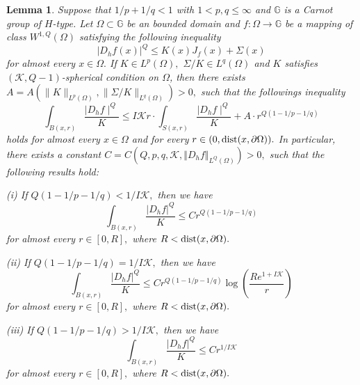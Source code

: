 \documentclass[11pt,twoside]{article}
\newtheorem{lem}[thm]{Lemma}
\theoremstyle{definition}
\theoremstyle{remark}
\newcommand{\abs}[1]{\left|#1\right|}
\begin{document}
\begin{lem}\label{lem0}
 Suppose that  $1/p+1/q<1$ with $1<p,q\leq\infty$ and  $\mathbb{G}$ is a Carnot group of $H$-type. Let $\Omega\subset \mathbb{G}$ be an bounded domain and $f:\Omega\rightarrow \mathbb{G}$ be a mapping of class $W^{1,Q}(\Omega)$ satisfying  the following inequality
$$\vert D_{h}f(x)\vert^{Q}\leq K(x)J_{f}(x)+\Sigma(x)$$
for almost every $x\in\Omega.$ If $K\in L^{p}(\Omega),$ $\Sigma/K\in L^{q}(\Omega)$ and $K$ satisfies $(\mathcal{K}, Q-1)$-spherical condition on $\Omega$,
 then there exists $A=A(\|K\|_{L^{p}(\Omega)},\|\Sigma/K\|_{L^{q}(\Omega)})>0,$ such that the followings inequality
$$\int_{B(x,r)}\frac{\mid D_{h}f\mid^{Q}}{K}\leq I\mathcal{K}r\cdot\int_{S(x,r)}\frac{\mid D_{h}f\mid^{Q}}{K}+A\cdot r^{Q(1-1/p-1/q)}$$
holds for almost every $x\in\Omega$ and for every $r\in(0,{\rm dist}(x,\partial\Omega)).$ In particular, there exists a constant $C=C(Q,  p, q,\mathcal{K},\Vert D_{h}f\Vert_{L^{Q}(\Omega)})>0,$ such that the following results hold:

(i) If $Q(1-1/p-1/q)<1/I\mathcal{K},$ then we have 
$$\int_{B(x,r)}\frac{\abs{ D_{h}f}^{Q}}{K}\leq Cr^{Q(1-1/p-1/q)}$$
for almost every $r\in[0,R],$ where $R<{\rm dist}(x,\partial\Omega).$

(ii) If $Q(1-1/p-1/q)=1/I\mathcal{K},$ then we have 
$$\int_{B(x,r)}\frac{\abs{ D_{h}f}^{Q}}{K}\leq Cr^{Q(1-1/p-1/q)}\log\left(\frac{Re^{1+I\mathcal{K}}}{r}\right)$$
for almost every $r\in[0,R],$ where $R<{\rm dist}(x,\partial\Omega).$

(iii) If $Q(1-1/p-1/q)>1/I\mathcal{K},$ then we have 
$$\int_{B(x,r)}\frac{\abs{ D_{h}f}^{Q}}{K}\leq Cr^{1/I\mathcal{K}}$$
for almost every $r\in[0,R],$ where $R<{\rm dist}(x,\partial\Omega).$



\end{lem}
\end{document}

